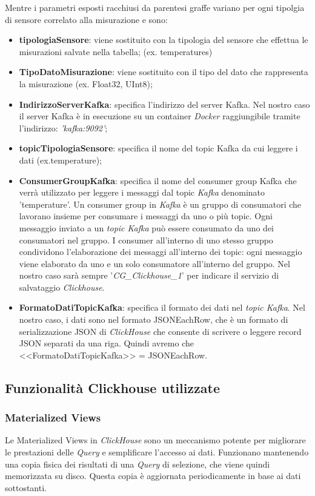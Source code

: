     Mentre i parametri esposti racchiusi da parentesi graffe variano per ogni tipolgia di sensore correlato alla misurazione e sono:
    \begin{itemize}
        \item \textbf{tipologiaSensore}: viene sostituito con la tipologia del sensore che effettua le misurazioni salvate nella tabella; (ex. temperatures)
        \item \textbf{TipoDatoMisurazione}: viene sostituito con il tipo del dato che rappresenta la misurazione (ex. Float32, UInt8);
        \item \textbf{IndirizzoServerKafka}: specifica l'indirizzo del server Kafka.
        Nel nostro caso il server Kafka è in esecuzione su un container \textit{Docker} raggiungibile tramite l'indirizzo:
         \textit{'kafka:9092'};
        \item \textbf{topicTipologiaSensore}: specifica il nome del topic Kafka da cui leggere i dati (ex.temperature);
        \item \textbf{ConsumerGroupKafka}: specifica il nome del consumer group Kafka che verrà utilizzato per leggere i messaggi dal topic \textit{Kafka} denominato 'temperature'.
        Un consumer group in \textit{Kafka} è un gruppo di consumatori che lavorano insieme per consumare i messaggi da uno o più topic. Ogni messaggio inviato a un \textit{topic Kafka} può essere consumato da uno dei consumatori nel gruppo. I consumer all'interno di uno stesso gruppo condividono l'elaborazione dei messaggi all'interno dei topic: ogni messaggio viene elaborato da uno e un solo consumatore all'interno del gruppo. Nel nostro caso sarà sempre '\textit{CG\_Clickhouse\_1}' per indicare il servizio di salvataggio \textit{Clickhouse}.
        \item \textbf{FormatoDatiTopicKafka}: specifica il formato dei dati nel \textit{topic Kafka}. Nel nostro caso, i dati sono nel formato JSONEachRow, che è un formato di serializzazione JSON di \textit{ClickHouse} che consente di scrivere o leggere record JSON separati da una riga. Quindi avremo che <<FormatoDatiTopicKafka>> = JSONEachRow.
    \end{itemize}

    
\subsection{Funzionalità Clickhouse utilizzate}
\subsubsection{Materialized Views}
Le Materialized Views in \textit{ClickHouse} sono un meccanismo potente per migliorare le prestazioni delle \textit{Query} e semplificare l'accesso ai dati. Funzionano mantenendo una copia fisica dei risultati di una \textit{Query} di selezione, che viene quindi memorizzata su disco. Questa copia è aggiornata periodicamente in base ai dati sottostanti.

